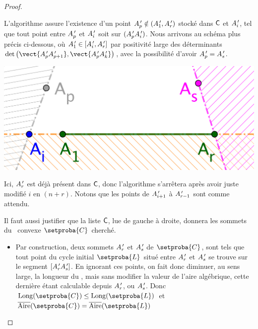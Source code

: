 \begin{proof}
\begin{itemize}
        \noindent
        L'algorithme assure l'existence d'un point $A^{\,\prime}_p \notin ( A^{\,\prime}_1 , A^{\,\prime}_r )$ stocké dans $\mathsf{C}$ et  $A^{\,\prime}_i$,
        tel que tout point entre $A^{\,\prime}_p$ et $A^{\,\prime}_i$ soit sur $(A^{\,\prime}_p A^{\,\prime}_i)$.
        Nous arrivons au schéma plus précis ci-dessous, où
        $A^{\,\prime}_1 \in [ A^{\,\prime}_i , A^{\,\prime}_r ]$
        par positivité large des déterminants
        $\det \big( \vect{\primeit{A}_p \primeit{A}_{p+1}}, \vect{\primeit{A}_p \primeit{A}_k} \big)$,
        avec la possibilité d'avoir $A^{\,\prime}_p = A^{\,\prime}_s$.
        \begin{center}
        	\includegraphics[scale=.4]{content/polygon/at-least-one/algo-kgone-terminate-3.png}
        \end{center}
        
        \noindent
        Ici,
        $A^{\,\prime}_r$ est déjà présent dans $\mathsf{C}$,
        donc l'algorithme s'arrêtera après avoir juste modifié $i$ en $(n + r)$.
        Notons que les points de $A^{\,\prime}_{i+1}$ à $A^{\,\prime}_{r-1}$ sont  comme attendu.
    \end{itemize}
    
    
    \medskip
    
    
    Il faut aussi justifier que la liste $\mathsf{C}$, lue de gauche à droite, donnera les sommets du \kgone\ convexe $\setproba{C}$ cherché.
    \begin{itemize}
        \item Par construction, deux sommets  $A^{\,\prime}_r$ et $A^{\,\prime}_s$ de $\setproba{C}$, sont tels que tout point du cycle initial $\setproba{L}$ situé entre $A^{\,\prime}_r$ et $A^{\,\prime}_s$ se trouve sur le segment $[A^{\,\prime}_r A^{\,\prime}_s]$.
        En ignorant ces points, on fait donc diminuer, au sens large, la longueur du \ncycle, mais sans modifier la valeur de l'aire algébrique, cette dernière étant calculable depuis $A^{\,\prime}_r$, ou $A^{\,\prime}_s$.
        Donc
        $\cyclelen{\setproba{C}} \leq \cyclelen{\setproba{L}}$
		et
		$\sarea{\setproba{C}} = \sarea{\setproba{L}}$



\end{itemize}
\end{proof}
